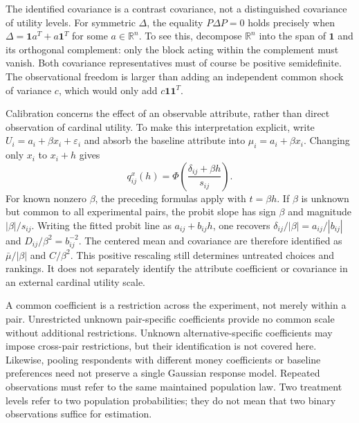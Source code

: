 \documentclass[11pt]{amsart}
\theoremstyle{definition}\newtheorem{example}[theorem]{Example}
\theoremstyle{remark}\newtheorem{remark}[theorem]{Remark}
\newcommand{\R}{\mathbb R}\newcommand{\E}{\mathbb E}\newcommand{\Prob}{\mathbb P}
\newcommand{\one}{\mathbf 1}\newcommand{\diag}{\operatorname{diag}}
\begin{document}
The identified covariance is a contrast covariance, not a distinguished covariance of utility levels. For symmetric $\Delta$, the equality $P\Delta P=0$ holds precisely when $\Delta=\one a^T+a\one^T$ for some $a\in\R^n$. To see this, decompose $\R^n$ into the span of $\one$ and its orthogonal complement: only the block acting within the complement must vanish. Both covariance representatives must of course be positive semidefinite. The observational freedom is larger than adding an independent common shock of variance $c$, which would only add $c\one\one^T$.

Calibration concerns the effect of an observable attribute, rather than direct observation of cardinal utility. To make this interpretation explicit, write $U_i=a_i+\beta x_i+\varepsilon_i$ and absorb the baseline attribute into $\mu_i=a_i+\beta x_i$. Changing only $x_i$ to $x_i+h$ gives
\begin{equation}\label{eq:attribute_response}
 q^x_{ij}(h)=\Phi\left(\frac{\delta_{ij}+\beta h}{s_{ij}}\right).
\end{equation}
For known nonzero $\beta$, the preceding formulas apply with $t=\beta h$. If $\beta$ is unknown but common to all experimental pairs, the probit slope has sign $\beta$ and magnitude $|\beta|/s_{ij}$. Writing the fitted probit line as $a_{ij}+b_{ij}h$, one recovers $\delta_{ij}/|\beta|=a_{ij}/|b_{ij}|$ and $D_{ij}/\beta^2=b_{ij}^{-2}$. The centered mean and covariance are therefore identified as $\bar\mu/|\beta|$ and $C/\beta^2$. This positive rescaling still determines untreated choices and rankings. It does not separately identify the attribute coefficient or covariance in an external cardinal utility scale.

A common coefficient is a restriction across the experiment, not merely within a pair. Unrestricted unknown pair-specific coefficients provide no common scale without additional restrictions. Unknown alternative-specific coefficients may impose cross-pair restrictions, but their identification is not covered here. Likewise, pooling respondents with different money coefficients or baseline preferences need not preserve a single Gaussian response model. Repeated observations must refer to the same maintained population law. Two treatment levels refer to two population probabilities; they do not mean that two binary observations suffice for estimation.
\end{document}
